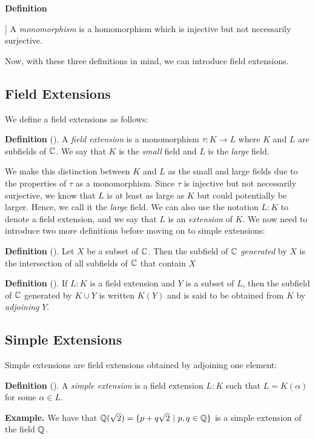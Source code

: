 \documentclass[11pt, a4paper, oneside]{article}
\theoremstyle{plain}
\theoremstyle{plain}
\theoremstyle{plain}
\theoremstyle{plain}
\theoremstyle{definition}
\theoremstyle{example}
\begin{document}
\textbf{Definition} {\cite[\S 1.2]{stewart}] A \textit{monomorphism} is a homomorphism which is injective but not necessarily surjective.

Now, with these three definitions in mind, we can introduce field extensions.

\subsection{Field Extensions}

We define a field extensions as follows:

\textbf{Definition} (\cite[Definition 4.1]{stewart}). A \textit{field extension} is a monomorphism $\tau: K \to L$ where $K$ and $L$ are subfields of $\mathbb{C}$. We say that $K$ is the \textit{small} field and $L$ is the \textit{large} field.

We make this distinction between $K$ and $L$ as the small and large fields due to the properties of $\tau$ as a monomorphism. Since $\tau$ is injective but not necessarily surjective, we know that $L$ is at least as large as $K$ but could potentially be larger. Hence, we call it the \textit{large} field. We can also use the notation $L:K$ to denote a field extension, and we say that $L$ is an \textit{extension} of $K$. We now need to introduce two more definitions before moving on to simple extensions:

\textbf{Definition} (\cite[Definition 4.3]{stewart}). Let $X$ be a subset of $\mathbb{C}$. Then the subfield of $\mathbb{C}$ \textit{generated} by $X$ is the intersection of all subfields of $\mathbb{C}$ that contain $X$

\textbf{Definition} (\cite[Definition 4.7]{stewart}). If $L:K$ is a field extension and $Y$ is a subset of $L$, then the subfield of $\mathbb{C}$ generated by $K \cup Y$ is written $K(Y)$ and is said to be obtained from $K$ by \textit{adjoining} $Y$.

\newpage
\subsection{Simple Extensions}

Simple extensions are field extensions obtained by adjoining one element:

\textbf{Definition} (\cite[Definition 4.10]{stewart}). A \textit{simple extension} is a field extension $L:K$ such that $L = K(\alpha)$ for some $\alpha \in L$.

\textbf{Example.} We have that $\mathbb{Q}(\sqrt{2}) = \{p + q\sqrt{2} \ | \ p, q \in \mathbb{Q}\}$ is a simple extension of the field $\mathbb{Q}$.

}
\end{document}
